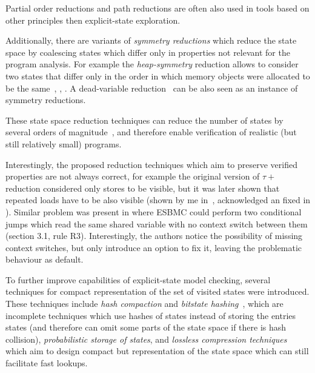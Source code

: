 Partial order reductions and path reductions are often also used in tools based
on other principles then explicit-state exploration.

Additionally, there are variants of \emph{symmetry reductions} which reduce the
state space by coalescing states which differ only in properties not relevant
for the program analysis.
For example the \emph{heap-symmetry} reduction allows to consider two states
that differ only in the order in which memory objects were allocated to be the
same~\cite{RBB13}, \cite[Chapter 6]{RSCB2018}, \cite{TODO}.
A dead-variable reduction~\cite{Yorav2004,Yorav2004:4,TODO} can be also seen as an instance of symmetry reductions.

These state space reduction techniques can reduce the number of states by
several orders of magnitude~\cite{TODO}, and therefore enable verification of
realistic (but still relatively small) programs.

Interestingly, the proposed reduction techniques which aim to preserve verified properties are not always correct, for example the original version of $\tau+$ reduction considered only stores to be visible, but it was later shown that repeated loads have to be also visible (shown by me in~\cite{S2016}, acknowledged an fixed in \cite[Section 6]{RSCB2018}).
Similar problem was present in \cite{Cordeiro2011} where ESBMC could perform two conditional jumps which read the same shared variable with no context switch between them (section 3.1, rule R3).
Interestingly, the authors notice the possibility of missing context switches, but only introduce an option to fix it, leaving the problematic behaviour as default.

To further improve capabilities of explicit-state model checking, several
techniques for compact representation of the set of visited states were
introduced.
These techniques include \emph{hash compaction} and \emph{bitstate
hashing}~\cite{Holzmann1998}, which are incomplete techniques which use hashes
of states instead of storing the entries states (and therefore can omit some
parts of the state space if there is hash collision),
\emph{probabilistic storage of states}, and
\emph{lossless compression techniques}~\cite{RSB15TC,Laarman2019} which aim to design compact but representation of the state space which can still facilitate fast lookups.

